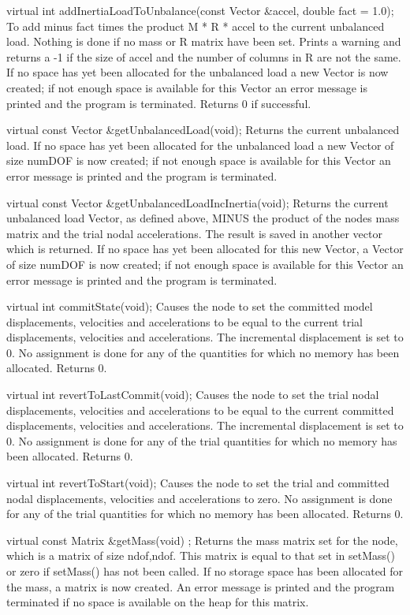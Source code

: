   virtual int addInertiaLoadToUnbalance(const Vector
&accel, double fact = 1.0);  
To add  minus  fact times the product M * R * accel to the
current unbalanced load. Nothing is done if no mass or R matrix have
been set. Prints a warning and returns a -1 if the size of accel and
the number of columns in R are not the same. If no space has yet been
allocated for the unbalanced load a new Vector is now created;  
if not enough space is available for this Vector an error message is
printed and the program is terminated. Returns 0 if successful.   

 virtual const Vector &getUnbalancedLoad(void); 
Returns the current unbalanced load. If no space has yet been
allocated for the unbalanced load a new Vector of size  numDOF is
now created; if not enough space is available for this Vector an error
message is printed and the program is terminated.  

 virtual const Vector &getUnbalancedLoadIncInertia(void); 
Returns the current unbalanced load Vector, as defined above, MINUS the product
of the nodes mass matrix and the trial nodal accelerations. The result
is saved in another vector which is returned. If no space has yet been
allocated for this new Vector, a Vector of size  numDOF is now
created; if not enough space is available for this Vector an error
message is printed and the program is terminated.  

 virtual int commitState(void); 
Causes the node to set the committed model displacements, velocities and
accelerations to be equal to the current trial displacements, velocities and
accelerations. The incremental displacement is set to 0. No assignment is done 
for any of the quantities for
which no memory has been allocated. Returns 0.

 virtual int revertToLastCommit(void); 
Causes the node to set the trial nodal displacements, velocities and
accelerations to be equal to the current committed displacements, velocities and
accelerations. The incremental displacement is set to 0. No assignment is done 
for any of the trial quantities for which no memory has been allocated. Returns 0.

 virtual int revertToStart(void); 
Causes the node to set the trial and committed nodal displacements,
velocities and accelerations to zero. No assignment is done for any of
the trial quantities for which no memory has been allocated. Returns 0.


 virtual const Matrix &getMass(void) ;
Returns the mass matrix set for the node, which is a matrix of size
 ndof,ndof. This matrix is equal to that set in  setMass()
or zero if  setMass() has not been called. If no storage space
has been allocated for the mass, a matrix is now created. An error
message is printed and the program terminated if no space is available
on the heap for this matrix.

